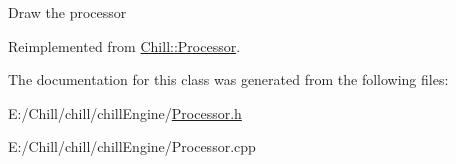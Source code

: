 Draw the processor 

Reimplemented from \mbox{\hyperlink{class_chill_1_1_processor_a2eb86d9750e1c0d5ac7f6da166aca8fd}{Chill\+::\+Processor}}.



The documentation for this class was generated from the following files\+:\begin{DoxyCompactItemize}
\item 
E\+:/\+Chill/chill/chill\+Engine/\mbox{\hyperlink{_processor_8h}{Processor.\+h}}\item 
E\+:/\+Chill/chill/chill\+Engine/Processor.\+cpp\end{DoxyCompactItemize}
